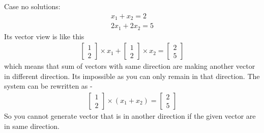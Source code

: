 \documentclass{article}
\begin{document}
Case no solutions:
\begin{align}
    x_1 + x_2 = 2 \nonumber\\
    2x_1 + 2x_2 = 5  \nonumber
\end{align}
Its vector view is like this
\begin{align}
    \begin{bmatrix}
    1\\2
    \end{bmatrix} \times x_1 +
    \begin{bmatrix}
    1\\2
    \end{bmatrix} \times x_2 = 
    \begin{bmatrix}
    2\\5
    \end{bmatrix} \nonumber
\end{align}
which means that sum of vectors with same direction are making another vector in different direction. Its impossible as you can only remain in that direction. The system can be rewritten as -
\begin{align}
    \begin{bmatrix}
    1\\2
    \end{bmatrix} \times (x_1 +x_2)=\begin{bmatrix}
    2\\5
    \end{bmatrix} \nonumber
\end{align}
So you cannot generate vector that is in another direction if the given vector are in same direction.
\end{document}
